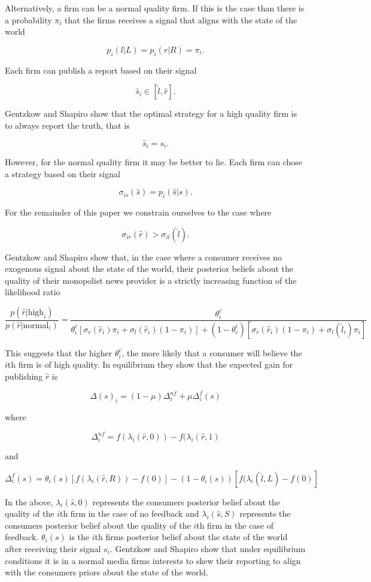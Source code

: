 \documentclass[a4paper]{article}
\begin{document}
Alternatively, a firm can be a normal quality firm.  If this is the case than there is a probability $\pi_i$ that the firms receives a signal that aligns with the state of the world

\[p_i(l|L) = p_i(r|R) = \pi_i.\]

Each firm can publish a report based on their signal

\[\hat{s}_i \in [\hat{l}, \hat{r}].\]

Gentzkow and Shapiro show that the optimal strategy for a high quality firm is to always report the truth, that is

\[\hat{s}_i = s_i.\]

However, for the normal quality firm it may be better to lie.  Each firm can chose a strategy based on their signal

\[\sigma_{is}(\hat{s}) = p_i(\hat{s}|s).\]

For the remainder of this paper we constrain ourselves to the case where 

\[\sigma_{ir}(\hat{r}) > \sigma_{il}(\hat{l}).\]

Gentzkow and Shapiro show that, in the case where a consumer receives no exogenous signal about the state of the world, their posterior beliefs about the quality of their monopolist news provider is a strictly increasing function of the likelihood ratio

\[\frac{p(\hat{r}|\text{high}_i)}{p(\hat{r}|\text{normal}_i)}=\frac{\theta_i^c}{\theta_i^c[\sigma_r(\hat{r}_i) \pi_i + \sigma_l(\hat{r}_i)(1-\pi_i)] + (1 - \theta_c^i)[\sigma_r(\hat{r}_i)(1-\pi_i) + \sigma_l(\hat{l}_i)\pi_i]}\]

This suggests that the higher $\theta_i^c$, the more likely that a consumer will believe the $i$th firm is of high quality.  In equilibrium they show that the expected gain for publishing $\hat{r}$ is

\[\Delta(s)_i = (1 - \mu)\Delta^{nf}_i+\mu \Delta^f_i(s)\]

where

\[\Delta^{nf}_i =f(\lambda_i(\hat{r}, 0)) - f(\lambda_i(\hat{r}, 1)\]

and

\[\Delta^f_i(s) = \theta_i(s)[f(\lambda_i(\hat{r}, R)) - f(0)] - (1-\theta_i(s))[f(\lambda_i(\hat{l},L) - f(0)]\]

In the above, $\lambda_i(\hat{s},0)$ represents the consumers posterior belief about the quality of the $i$th firm in the case of no feedback and $\lambda_i(\hat{s},S)$ represents the consumers posterior belief about the quality of the $i$th firm in the case of feedback.  $\theta_i(s)$ is the $i$th firms posterior belief about the state of the world after receiving their signal $s_i$. Gentzkow and Shapiro show that under equilibrium conditions it is in a normal media firms interests to skew their reporting to align with the consumers priors about the state of the world.
\end{document}
